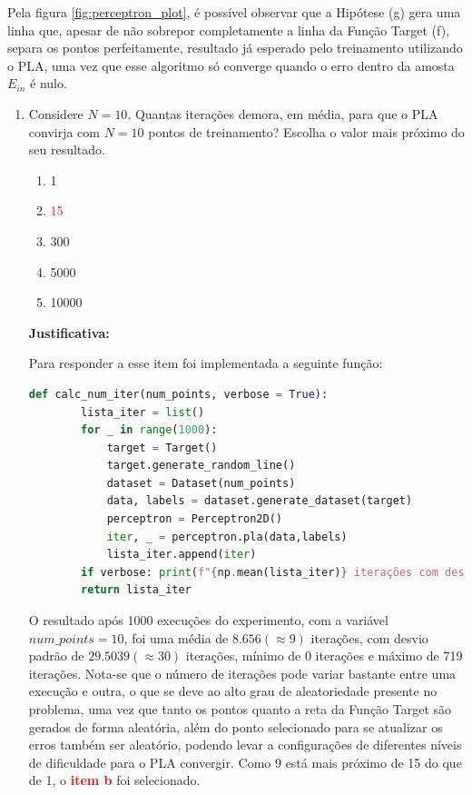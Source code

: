 Pela figura \ref{fig:perceptron_plot}, é possível observar que a Hipótese (g) gera uma linha que, apesar de não sobrepor completamente a linha da Função Target (f), separa os pontos perfeitamente, resultado já esperado pelo treinamento utilizando o PLA, uma vez que esse algoritmo só converge quando o erro dentro da amosta $E_{in}$ é nulo.  

\begin{enumerate}
    \item Considere $N = 10$. Quantas iterações demora, em média, para que o PLA convirja com $N = 10$
    pontos de treinamento? Escolha o valor mais próximo do seu resultado.

    \begin{enumerate}
        \item 1
        \item[\textcolor{red}{(b)}]\textcolor{red}{15}\addtocounter{enumii}{1}
        \item 300
        \item 5000
        \item 10000
    \end{enumerate}
     
    \par

    \textbf{Justificativa:}

    Para responder a esse item foi implementada a seguinte função:

    \begin{lstlisting}[language=Python, caption=Cálculo do número de iterações, label=cod:perceptron_num_iter]
        def calc_num_iter(num_points, verbose = True):
        lista_iter = list()
        for _ in range(1000):
            target = Target()
            target.generate_random_line()
            dataset = Dataset(num_points)
            data, labels = dataset.generate_dataset(target)
            perceptron = Perceptron2D()
            iter, _ = perceptron.pla(data,labels)
            lista_iter.append(iter)
        if verbose: print(f"{np.mean(lista_iter)} iterações com desvio padrão {np.std(lista_iter):.4f} (min:{np.min(lista_iter)}, máx:{np.max(lista_iter)})")
        return lista_iter
    \end{lstlisting}

    O resultado após 1000 execuções do experimento, com a variável $num\_points = 10$, foi uma média de $8.656(\approx 9)$ iterações, com desvio padrão de $29.5039(\approx 30)$ iterações, mínimo de 0 iterações e máximo de 719 iterações. Nota-se que o número de iterações pode variar bastante entre uma execução e outra, o que se deve ao alto grau de aleatoriedade presente no problema, uma vez que tanto os pontos quanto a reta da Função Target são gerados de forma aleatória, além do ponto selecionado para se atualizar os erros também ser aleatório, podendo levar a configurações de diferentes níveis de dificuldade para o PLA convergir. 
     Como 9 está mais próximo de 15 do que de 1, o \textcolor{red}{\textbf{item b}} foi selecionado. 
    

\end{enumerate}
